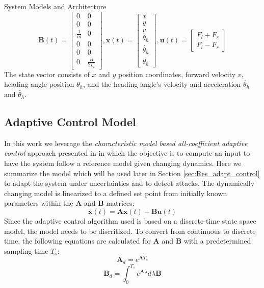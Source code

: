 \begin{section}{System Models and Architecture}
\begin{equation}
	\bm{B}(t)=\begin{bmatrix} 0 & 0 \\ 0 & 0 \\ \frac{1}{m} & 0 \\ 0 & 0  \\ 0 & 0 \\  0 & \frac{B}{2I_z} \end{bmatrix}, \bm{x}(t)=\begin{bmatrix} x \\ y \\ v \\ \theta_h \\ \dot{\theta_h} \\ \ddot{\theta_h} \end{bmatrix}, \bm{u}(t)=\begin{bmatrix} F_l+F_r \\ F_l-F_r \end{bmatrix} \nonumber
	\end{equation}
The state vector consists of $x$ and $y$ position coordinates, forward velocity $v$, heading angle position $\theta_h$, and the heading angle's velocity and acceleration $\dot{\theta_h}$ and $\ddot{\theta_h}$.
	



\subsection{Adaptive Control Model}
In this work we leverage the \textit{characteristic model based all-coefficient adaptive control} approach presented in \cite{4106038} in which the objective is to compute an input to have the system follow a reference model given changing dynamics. Here we summarize the model which will be used later in Section  \ref{sec:Res_adapt_control} to adapt the system under uncertainties and to detect attacks. The dynamically changing model is linearized to a defined set point from initially known parameters within the $\bm{A}$ and $\bm{B}$ matrices:
	\begin{equation}
	\dot{\bm{x}}(t) = \bm{A}\bm{x}(t) + \bm{B}\bm{u}(t)
	\end{equation}
Since the adaptive control algorithm used is based on a discrete-time state space model, the model needs to be discritized. To convert from continuous to discrete time, the following equations are calculated for $\bm{A}$ and $\bm{B}$ with a predetermined sampling time $T_s$:
    \begin{equation}
	\bm{A}_d = e^{\bm{A}T_s}
	\end{equation}
    \begin{equation}
	\bm{B}_d = \int_0^{T_s} e^{\bm{A}\lambda}d\lambda \bm{B}
	\end{equation}


\end{section}
